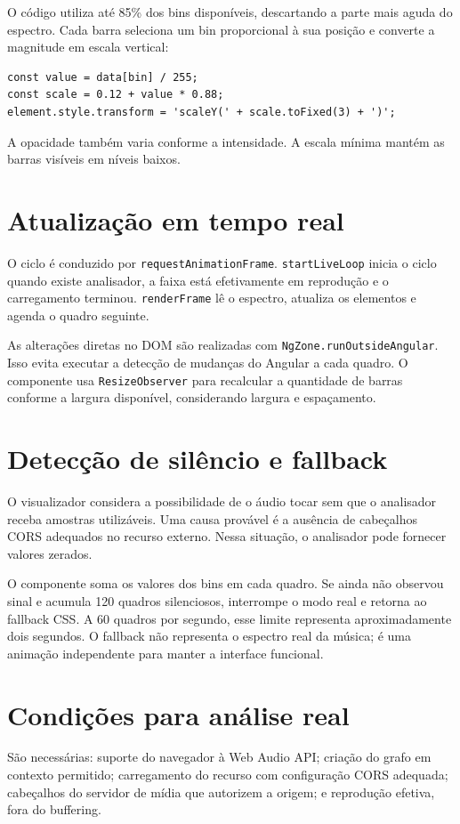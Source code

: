 \documentclass[12pt,a4paper,oneside]{report}
\begin{document}
O código utiliza até 85\% dos bins disponíveis, descartando a parte mais aguda do espectro. Cada barra seleciona um bin proporcional à sua posição e converte a magnitude em escala vertical:
\begin{lstlisting}
const value = data[bin] / 255;
const scale = 0.12 + value * 0.88;
element.style.transform = 'scaleY(' + scale.toFixed(3) + ')';
\end{lstlisting}
A opacidade também varia conforme a intensidade. A escala mínima mantém as barras visíveis em níveis baixos.

\section{Atualização em tempo real}
O ciclo é conduzido por \texttt{requestAnimationFrame}. \texttt{startLiveLoop} inicia o ciclo quando existe analisador, a faixa está efetivamente em reprodução e o carregamento terminou. \texttt{renderFrame} lê o espectro, atualiza os elementos e agenda o quadro seguinte.

As alterações diretas no DOM são realizadas com \texttt{NgZone.runOutsideAngular}. Isso evita executar a detecção de mudanças do Angular a cada quadro. O componente usa \texttt{ResizeObserver} para recalcular a quantidade de barras conforme a largura disponível, considerando largura e espaçamento.

\section{Detecção de silêncio e fallback}
O visualizador considera a possibilidade de o áudio tocar sem que o analisador receba amostras utilizáveis. Uma causa provável é a ausência de cabeçalhos CORS adequados no recurso externo. Nessa situação, o analisador pode fornecer valores zerados.

O componente soma os valores dos bins em cada quadro. Se ainda não observou sinal e acumula 120 quadros silenciosos, interrompe o modo real e retorna ao fallback CSS. A 60 quadros por segundo, esse limite representa aproximadamente dois segundos. O fallback não representa o espectro real da música; é uma animação independente para manter a interface funcional.

\section{Condições para análise real}
São necessárias: suporte do navegador à Web Audio API; criação do grafo em contexto permitido; carregamento do recurso com configuração CORS adequada; cabeçalhos do servidor de mídia que autorizem a origem; e reprodução efetiva, fora do buffering.
\end{document}
